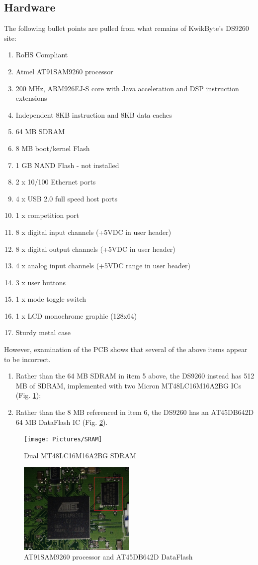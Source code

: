 \documentclass[]{article}
\begin{document}
\subsection{Hardware}
	\par The following bullet points are pulled from what remains of KwikByte's DS9260 site:
	\begin{enumerate}
		\item RoHS Compliant
		\item Atmel AT91SAM9260 processor
		\item 200 MHz, ARM926EJ-S core with Java acceleration and DSP instruction extensions
		\item Independent 8KB instruction and 8KB data caches
		\item 64 MB SDRAM
		\item 8 MB boot/kernel Flash
		\item 1 GB NAND Flash - not installed
		\item 2 x 10/100 Ethernet ports
		\item 4 x USB 2.0 full speed host ports
		\item 1 x competition port
		\item 8 x digital input channels (+5VDC in user header)
		\item 8 x digital output channels (+5VDC in user header)
		\item 4 x analog input channels (+5VDC range in user header)
		\item 3 x user buttons
		\item 1 x mode toggle switch
		\item 1 x LCD monochrome graphic (128x64)
		\item Sturdy metal case
	\end{enumerate}
	However, examination of the PCB shows that several of the above items appear to be incorrect. 
	\begin{enumerate}
		\item Rather than the 64 MB SDRAM in item 5 above, the DS9260 instead has 512 MB of SDRAM, implemented with two Micron MT48LC16M16A2BG ICs (Fig. \ref{fig:SDRAM});
		\item Rather than the 8 MB referenced in item 6, the DS9260 has an AT45DB642D 64 MB DataFlash IC (Fig. \ref{fig:Flash}).
	\end{enumerate}
	\begin{figure}
		\centering
		\texttt{[image: Pictures/SRAM]}
		\caption{Dual MT48LC16M16A2BG SDRAM}
		\label{fig:SDRAM}
	\end{figure}
	\begin{figure}
		\centering
		\includegraphics[width=0.5\textwidth]{Pictures/Flash}
		\caption{AT91SAM9260 processor and AT45DB642D DataFlash}
		\label{fig:Flash}
	\end{figure}
\end{document}
